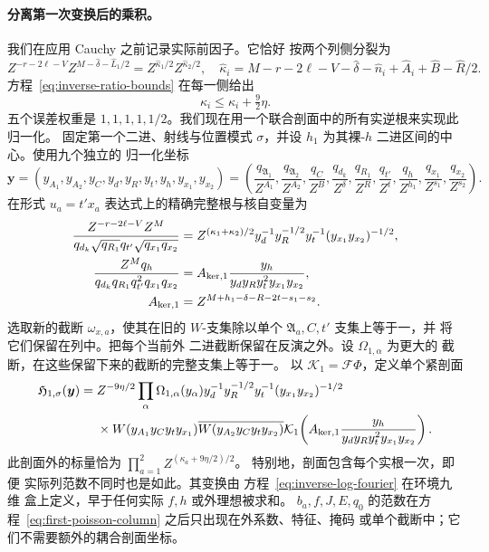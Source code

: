 \paragraph{分离第一次变换后的乘积。}
我们在应用 Cauchy 之前记录实际前因子。它恰好
按两个列侧分裂为
\[
 Z^{-r-2\ell-V}Z^{M-\widehat\delta-\widehat L_1/2}
       =Z^{\widehat\kappa_1/2}Z^{\widehat\kappa_2/2},
 \quad
 \widehat\kappa_i=M-r-2\ell-V-\widehat\delta-\widehat n_i
                  +\widehat A_i+\widehat B-\widehat R/2.
\]
方程~\eqref{eq:inverse-ratio-bounds} 在每一侧给出
\begin{equation}\label{eq:inverse-first-prefactor-error}
 \widehat\kappa_i\le\kappa_i+\tfrac92\eta.
\end{equation}
五个误差权重是 \(1,1,1,1,1/2\)。我们现在用一个联合剖面中的所有实逆根来实现此
归一化。
固定第一个二进、射线与位置模式 \(\sigma\)，并设 \(h_1\)
为其裸-\(h\) 二进区间的中心。使用九个独立的
归一化坐标
\[
 \boldsymbol y=(y_{A_1},y_{A_2},y_C,y_d,y_R,y_t,y_h,y_{x_1},y_{x_2})
 =\left(\frac{q_{\mathfrak A_1}}{Z^{A_1}},
 \frac{q_{\mathfrak A_2}}{Z^{A_2}},\frac{q_C}{Z^B},
 \frac{q_{d_k}}{Z^\delta},\frac{q_{R_1}}{Z^R},\frac{q_{t'}}{Z^t},
 \frac{q_h}{Z^{h_1}},\frac{q_{x_1}}{Z^{s_1}},\frac{q_{x_2}}{Z^{s_2}}\right).
\]
在形式 \(u_a=t'x_a\) 表达式上的精确完整根与核自变量为
\begin{equation}\label{eq:inverse-first-root-kernel}
 \begin{split}
 \frac{Z^{-r-2\ell-V}Z^M}
 {q_{d_k}\sqrt{q_{R_1}}q_{t'}\sqrt{q_{x_1}q_{x_2}}}
 &=Z^{(\kappa_1+\kappa_2)/2}
 y_d^{-1}y_R^{-1/2}y_t^{-1}(y_{x_1}y_{x_2})^{-1/2},\\
 \frac{Z^Mq_h}{q_{d_k}q_{R_1}q_{t'}^2q_{x_1}q_{x_2}}
 &=A_{{\rm ker},1}\frac{y_h}{y_dy_Ry_t^2y_{x_1}y_{x_2}},\\
 A_{{\rm ker},1}&=Z^{M+h_1-\delta-R-2t-s_1-s_2}.
 \end{split}
\end{equation}
选取新的截断 \(\omega_{x,a}\)，使其在旧的
\(W\)-支集除以单个 \(\mathfrak A_a,C,t'\)
支集上等于一，并
将它们保留在列中。把每个当前外
二进截断保留在反演之外。设 \(\Omega_{1,\alpha}\) 为更大的
截断，在这些保留下来的截断的完整支集上等于一。
以 \(\mathcal K_1=\mathcal F\Phi\)，定义单个紧剖面
\begin{equation}\label{eq:inverse-first-profile}
 \begin{split}
 \mathfrak H_{1,\sigma}(\boldsymbol y)={}&Z^{-9\eta/2}
 \prod_\alpha\Omega_{1,\alpha}(y_\alpha)
 y_d^{-1}y_R^{-1/2}y_t^{-1}(y_{x_1}y_{x_2})^{-1/2}\\
 &\times W(y_{A_1}y_Cy_ty_{x_1})
       \overline{W(y_{A_2}y_Cy_ty_{x_2})}
 \mathcal K_1\!\left(A_{{\rm ker},1}
       \frac{y_h}{y_dy_Ry_t^2y_{x_1}y_{x_2}}\right).
 \end{split}
\end{equation}
此剖面外的标量恰为
\(\prod_{a=1}^2Z^{(\kappa_a+9\eta/2)/2}\)。
特别地，剖面包含每个实根一次，即便
实际列范数不同时也是如此。其变换由
方程~\eqref{eq:inverse-log-fourier} 在环境九维
盒上定义，早于任何实际 \(f,h\) 或外理想被求和。
\(b_a,f,J,E,q_0\) 的范数在方程~\eqref{eq:first-poisson-column} 之后只出现在外系数、特征、掩码
或单个截断中；它们不需要额外的耦合剖面坐标。

